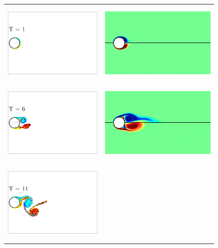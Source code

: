 \begin{figure}
 \begin{center}
 \begin{tabular}{cc}
 \includegraphics[height=4cm]{./Figures/results/rotating/vortices_T1.pdf}  &
 \includegraphics[height=4cm]{./Figures/results/rotating/T_1.png}  \\
 \includegraphics[height=4cm]{./Figures/results/rotating/vortices_T6.pdf}  &
 \includegraphics[height=4cm]{./Figures/results/rotating/T_6.png}  \\
 \includegraphics[height=4cm]{./Figures/results/rotating/vortices_T11.pdf}  &

\end{tabular}
\end{center}
\end{figure}
